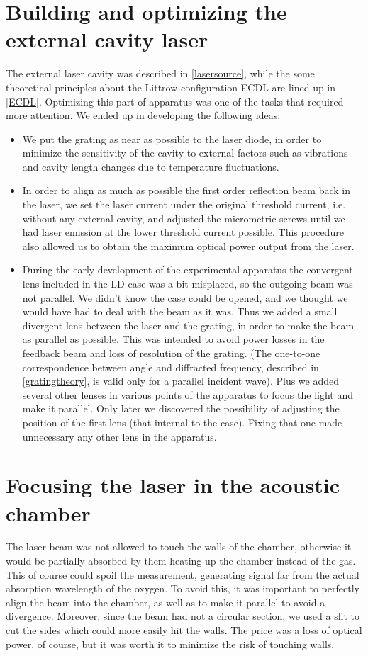 	\section{Building and optimizing the external cavity laser}
The external laser cavity was described in \cref{lasersource}, while the some theoretical principles about the Littrow configuration ECDL are lined up in \cref{ECDL}. Optimizing this part of apparatus was one of the tasks that required more attention. We ended up in developing the following ideas:
\begin{itemize}
\item We put the grating as near as possible to the laser diode, in order to minimize the sensitivity of the cavity to external factors such as vibrations and cavity length changes due to temperature fluctuations.
\item In order to align as much as possible the first order reflection beam back in the laser, we set the laser current under the original threshold current, i.e. without any external cavity, and adjusted the micrometric screws until we had laser emission at the lower threshold current possible. This procedure also allowed us to obtain the maximum optical power output from the laser. 
\item During the early development of the experimental apparatus the convergent lens included in the LD case was a bit misplaced, so the outgoing beam was not parallel. We didn't know the case could be opened, and we thought we would have had to deal with the beam as it was. Thus we added a small divergent lens between the laser and the grating, in order to make the beam as parallel as possible. This was intended to avoid power losses in the feedback beam and loss of resolution of the grating. (The one-to-one correspondence between angle and diffracted frequency, described in \cref{gratingtheory}, is valid only for a parallel incident wave). Plus we added several other lenses in various points of the apparatus to focus the light and make it parallel. Only later we discovered the possibility of adjusting the position of the first lens (that internal to the case). Fixing that one made unnecessary any other lens in the apparatus.
\end{itemize}

	\section{Focusing the laser in the acoustic chamber}\label{focusing}
The laser beam was not allowed to touch the walls of the chamber, otherwise it would be partially absorbed by them heating up the chamber instead of the gas. This of course could spoil the measurement, generating signal far from the actual absorption wavelength of the oxygen. To avoid this, it was important to perfectly align the beam into the chamber, as well as to make it parallel to avoid a divergence. Moreover, since the beam had not a circular section, we used a slit to cut the sides which could more easily hit the walls. The price was a loss of optical power, of course, but it was worth it to minimize the risk of touching walls.

